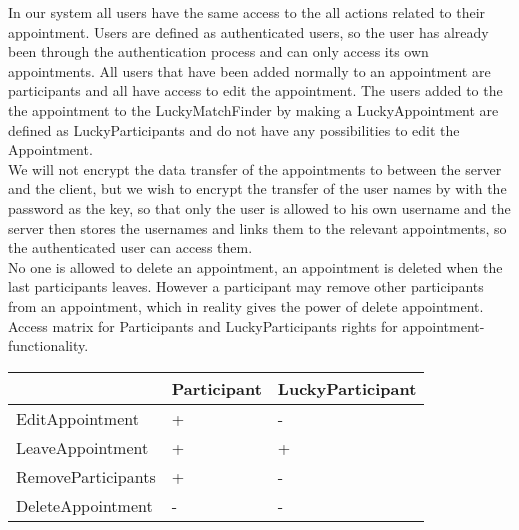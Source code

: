 In our system all users have the same access to the all actions related to their appointment. Users are defined as authenticated users, so the user has already been through the authentication process and can only access its own appointments. All users that have been added normally to an appointment are participants and all have access to edit the appointment. The users added to the the appointment to the LuckyMatchFinder by making a LuckyAppointment are defined as LuckyParticipants and do not have any possibilities to edit the Appointment.\\

We will not encrypt the data transfer of the appointments to between the server and the client, but we wish to encrypt the transfer of the user names by with the password as the key, so that only the user is allowed to his own username and the server then stores the usernames and links them to the relevant appointments, so the authenticated user can access them. \\

No one is allowed to delete an appointment, an appointment is deleted when the last participants leaves. 
However a participant may remove other participants from an appointment, which in reality gives the power of delete appointment.
Access matrix for Participants and LuckyParticipants rights for appointment-functionality.
{\tabulinesep=1.2mm
\begin{tabu}{ | p{3cm} | p{6cm} | p{6cm} |}
    \hline
     	 			        & 		Participant         &		LuckyParticipant \\ \hline
    EditAppointment         &       +					&		-          \\\hline
    LeaveAppointment        &       +					&		+      \\ \hline
    RemoveParticipants		&		+					&		- 		\\\hline
    DeleteAppointment       &       -					&		-        \\  \hline
\end{tabu}
}